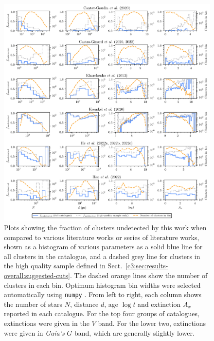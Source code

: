 \begin{figure}[p]
   \centering
   \includegraphics[width=\textwidth]{fig/c3/fig_results_xmatch_comparison.pdf}
   \caption[Plots showing the fraction of clusters undetected by this work when compared to various literature works or series of literature works]{Plots showing the fraction of clusters undetected by this work when compared to various literature works or series of literature works, shown as a histogram of various parameters as a solid blue line for all clusters in the catalogue, and a dashed grey line for clusters in the high quality sample defined in Sect.~\ref{c3:sec:results-overall:suggested-cuts}. The dashed orange lines show the number of clusters in each bin. Optimum histogram bin widths were selected automatically using \texttt{numpy} \citep{harris_array_2020}. From left to right, each column shows the number of stars $N$, distance $d$, age $\log t$ and extinction $A_x$ reported in each catalogue. For the top four groups of catalogues, extinctions were given in the $V$ band. For the lower two, extinctions were given in \emph{Gaia's} $G$ band, which are generally slightly lower.}%
   \label{c3:fig:crossmatch_comparison}
\end{figure}



